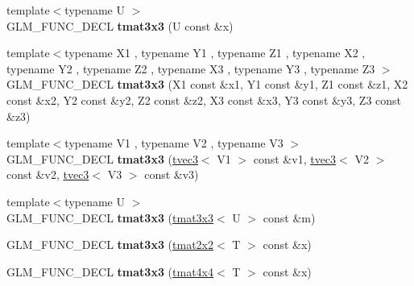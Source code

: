 \begin{DoxyCompactItemize}
\item 
\hypertarget{structglm_1_1detail_1_1tmat3x3_aa670b7140f58c3b1dfcc51c20b4fb2cd}{{\footnotesize template$<$typename U $>$ }\\G\-L\-M\-\_\-\-F\-U\-N\-C\-\_\-\-D\-E\-C\-L {\bfseries tmat3x3} (U const \&x)}\label{structglm_1_1detail_1_1tmat3x3_aa670b7140f58c3b1dfcc51c20b4fb2cd}

\item 
\hypertarget{structglm_1_1detail_1_1tmat3x3_ab0425c74c37b23c53fe07ed3d4487612}{{\footnotesize template$<$typename X1 , typename Y1 , typename Z1 , typename X2 , typename Y2 , typename Z2 , typename X3 , typename Y3 , typename Z3 $>$ }\\G\-L\-M\-\_\-\-F\-U\-N\-C\-\_\-\-D\-E\-C\-L {\bfseries tmat3x3} (X1 const \&x1, Y1 const \&y1, Z1 const \&z1, X2 const \&x2, Y2 const \&y2, Z2 const \&z2, X3 const \&x3, Y3 const \&y3, Z3 const \&z3)}\label{structglm_1_1detail_1_1tmat3x3_ab0425c74c37b23c53fe07ed3d4487612}

\item 
\hypertarget{structglm_1_1detail_1_1tmat3x3_a787532b9eb870c1b0f2d7ba56bc93d63}{{\footnotesize template$<$typename V1 , typename V2 , typename V3 $>$ }\\G\-L\-M\-\_\-\-F\-U\-N\-C\-\_\-\-D\-E\-C\-L {\bfseries tmat3x3} (\hyperlink{structglm_1_1detail_1_1tvec3}{tvec3}$<$ V1 $>$ const \&v1, \hyperlink{structglm_1_1detail_1_1tvec3}{tvec3}$<$ V2 $>$ const \&v2, \hyperlink{structglm_1_1detail_1_1tvec3}{tvec3}$<$ V3 $>$ const \&v3)}\label{structglm_1_1detail_1_1tmat3x3_a787532b9eb870c1b0f2d7ba56bc93d63}

\item 
\hypertarget{structglm_1_1detail_1_1tmat3x3_a1ebfe525d241841e712ce78807f8860d}{{\footnotesize template$<$typename U $>$ }\\G\-L\-M\-\_\-\-F\-U\-N\-C\-\_\-\-D\-E\-C\-L {\bfseries tmat3x3} (\hyperlink{structglm_1_1detail_1_1tmat3x3}{tmat3x3}$<$ U $>$ const \&m)}\label{structglm_1_1detail_1_1tmat3x3_a1ebfe525d241841e712ce78807f8860d}

\item 
\hypertarget{structglm_1_1detail_1_1tmat3x3_af32cfbe6209897b6021190d717ff0097}{G\-L\-M\-\_\-\-F\-U\-N\-C\-\_\-\-D\-E\-C\-L {\bfseries tmat3x3} (\hyperlink{structglm_1_1detail_1_1tmat2x2}{tmat2x2}$<$ T $>$ const \&x)}\label{structglm_1_1detail_1_1tmat3x3_af32cfbe6209897b6021190d717ff0097}

\item 
\hypertarget{structglm_1_1detail_1_1tmat3x3_a92e0e3bb09b8472e41f4ede37067bd22}{G\-L\-M\-\_\-\-F\-U\-N\-C\-\_\-\-D\-E\-C\-L {\bfseries tmat3x3} (\hyperlink{structglm_1_1detail_1_1tmat4x4}{tmat4x4}$<$ T $>$ const \&x)}\label{structglm_1_1detail_1_1tmat3x3_a92e0e3bb09b8472e41f4ede37067bd22}


\end{DoxyCompactItemize}
